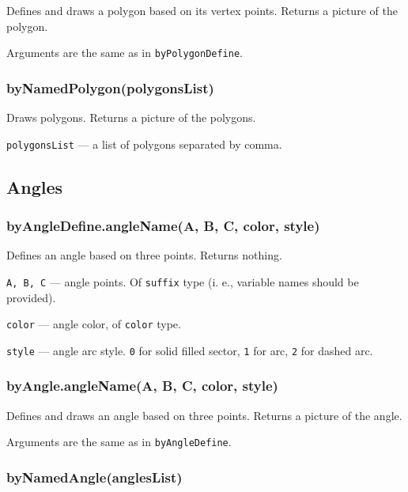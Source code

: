 \documentclass{ltxdoc}
\begin{document}
Defines and draws a polygon based on its vertex points. Returns a picture of the polygon.

Arguments are the same as in \texttt{byPolygonDefine}.



\subsubsection{byNamedPolygon(polygonsList)}

Draws polygons. Returns a picture of the polygons.

\texttt{polygonsList} — a list of polygons separated by comma.


\subsection{Angles}

\subsubsection{byAngleDefine.angleName(A, B, C, color, style)}

Defines an angle based on three points. Returns nothing.

\texttt{A, B, C} — angle points. Of \texttt{suffix} type (i. e., variable names should be provided).

\texttt{color} — angle color, of \texttt{color} type.

\texttt{style} — angle arc style. \texttt{0} for solid filled sector, \texttt{1} for arc, \texttt{2} for dashed arc.


\subsubsection{byAngle.angleName(A, B, C, color, style)}

Defines and draws an angle based on three points. Returns a picture of the angle.

Arguments are the same as in \texttt{byAngleDefine}.


\subsubsection{byNamedAngle(anglesList)}
\end{document}
